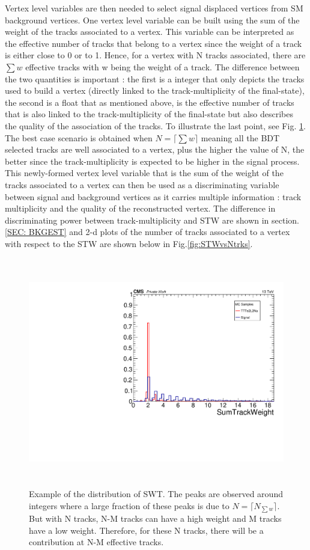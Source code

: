 \documentclass{cernatlasnote}
\begin{document}
Vertex level variables are then needed to select signal displaced vertices from SM background vertices. One vertex level variable can be built using the sum of the weight of the tracks associated to a vertex. This variable can be interpreted as the effective number of tracks that belong to a vertex since the weight of a track is either close to 0 or to 1.
Hence, for a vertex with N tracks associated, there are $\sum w$ effective tracks with w being the weight of a track. The difference between the two quantities is important : the first is a integer that only depicts the tracks used to build a vertex (directly linked to the track-multiplicity of the final-state), the second is a float that as mentioned above, is the effective number of tracks  that is also linked to the track-multiplicity of the final-state but also describes the quality of the association of the tracks. To illustrate the last point, see Fig. \ref{fig:nMTW}. The best case scenario is obtained when $ N = \lceil \sum w \rceil$ meaning all the BDT selected tracks are well associated to a vertex, plus the higher the value of N, the better since the track-multiplicity is expected to be higher in the signal process.\\
This newly-formed vertex level variable that is the sum of the weight of the tracks associated to a vertex can then be used as a discriminating variable between signal and background vertices as it carries multiple information : track multiplicity and the quality of the reconstructed vertex. The difference in discriminating power between track-multiplicity and STW are shown in section.\ref{SEC: BKGEST} and 2-d plots of the number of tracks associated to a vertex with respect to the STW are shown below in Fig.\ref{fig:STWvsNtrks}. 

\begin{figure}[ht]
\centering
\includegraphics[height=10cm, width=14cm, trim= 0cm 0cm 0cm 0cm,clip]{images/VTXEff/SumTrackWeightCompare.pdf}
\caption{\label{fig:nMTW} Example of the distribution of SWT. The peaks are observed around integers where a large fraction of these peaks is due to $ N = \lceil N_{\sum w}\rceil$. But with N tracks, N-M tracks can have a high weight and M tracks have a low weight. Therefore,  for these N tracks, there will be a contribution at N-M effective tracks.}
\end{figure} 
\end{document}
